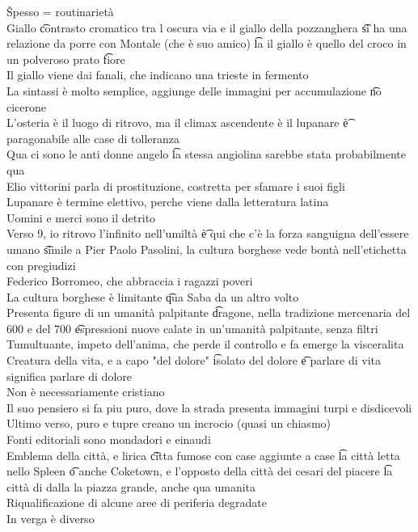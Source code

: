 \documentclass[12pt]{article}
\begin{document}
\v

Spesso = routinarietà \\
Giallo \t contrasto cromatico tra l oscura via e il giallo della pozzanghera \t si ha una relazione da porre con Montale (che è suo amico) \t la il giallo è quello del croco in un polveroso prato \t fiore \\
Il giallo viene dai fanali, che indicano una trieste in fermento \\
La sintassi è molto semplice, aggiunge delle immagini per accumulazione \t no cicerone \\
L'osteria è il luogo di ritrovo, ma il climax ascendente è il lupanare \t è paragonabile alle case di tolleranza \\
Qua ci sono le anti donne angelo \t la stessa angiolina sarebbe stata probabilmente qua \\
Elio vittorini parla di prostituzione, costretta per sfamare i suoi figli \\
Lupanare è termine elettivo, perche viene dalla letteratura latina \\
Uomini e merci sono il detrito \\
Verso 9, io ritrovo l'infinito nell'umiltà \t è qui che c'è la forza sanguigna dell'essere umano \t simile a Pier Paolo Pasolini, la cultura borghese vede bontà nell'etichetta con pregiudizi \\
Federico Borromeo, che abbraccia i ragazzi poveri \\
La cultura borghese è limitante \t qua Saba da un altro volto \\
Presenta figure di un umanità palpitante \t dragone, nella tradizione mercenaria del 600 e del 700 \t espressioni nuove calate in un'umanità palpitante, senza filtri \\
Tumultuante, impeto dell'anima, che perde il controllo e fa emerge la visceralita \\
Creatura della vita, e a capo "del dolore" \t isolato del dolore \t e parlare di vita significa parlare di dolore \\
Non è necessariamente cristiano \\
Il suo pensiero si fa piu puro, dove la strada presenta immagini turpi e disdicevoli \\
Ultimo verso, puro e tupre creano un incrocio (quasi un chiasmo) \\
Fonti editoriali sono mondadori e einaudi \\
Emblema della città, e lirica \t citta fumose con case aggiunte a case \t la città letta nello Spleen \t o anche Coketown, e l'opposto della città dei cesari del piacere \t la città di dalla la piazza grande, anche qua umanita \\
Riqualificazione di alcune aree di periferia degradate \\
In verga è diverso 
\end{document}
